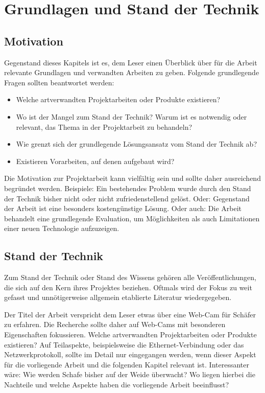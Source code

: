 
\chapter{Grundlagen und Stand der Technik}
\label{sec:Grundlagen}

\section{Motivation}
Gegenstand dieses Kapitels ist es, dem Leser einen Überblick über für die Arbeit relevante Grundlagen und verwandten Arbeiten zu geben. Folgende grundlegende Fragen sollten beantwortet werden:
\begin{itemize}
	\item Welche artverwandten Projektarbeiten oder Produkte existieren?
	\item Wo ist der Mangel zum Stand der Technik? Warum ist es notwendig oder relevant, das Thema in der Projektarbeit zu behandeln? 
	\item Wie grenzt sich der grundlegende Lösungsansatz vom Stand der Technik ab?
	\item Existieren Vorarbeiten, auf denen aufgebaut wird?
\end{itemize}

Die Motivation zur Projektarbeit kann vielfältig sein und sollte daher ausreichend begründet werden. Beispiele: Ein bestehendes Problem wurde durch den Stand der Technik bisher nicht oder nicht zufriedenstellend gelöst. Oder: Gegenstand der Arbeit ist eine besonders kostengünstige Lösung. Oder auch: Die Arbeit behandelt eine grundlegende Evaluation, um Möglichkeiten als auch Limitationen einer neuen Technologie aufzuzeigen.

\section{Stand der Technik}
\label{sec:StandderTechnik}

Zum Stand der Technik oder Stand des Wissens gehören alle Veröffentlichungen, die sich auf den Kern ihres Projektes beziehen. Oftmals wird der Fokus zu weit gefasst und unnötigerweise allgemein etablierte Literatur wiedergegeben.

\example Der Titel der Arbeit verspricht dem Leser etwas über eine Web-Cam für Schäfer zu erfahren. 
Die Recherche sollte daher auf Web-Cams mit besonderen Eigenschaften fokussieren. Welche artverwandten Projektarbeiten oder Produkte existieren? Auf Teilaspekte, beispielsweise die Ethernet-Verbindung oder das Netzwerkprotokoll, sollte im Detail nur eingegangen werden, wenn dieser Aspekt für die vorliegende Arbeit und die folgenden Kapitel relevant ist. Interessanter wäre: Wie werden Schafe bisher auf der Weide überwacht? Wo liegen hierbei die Nachteile und welche Aspekte haben die vorliegende Arbeit beeinflusst?\\

